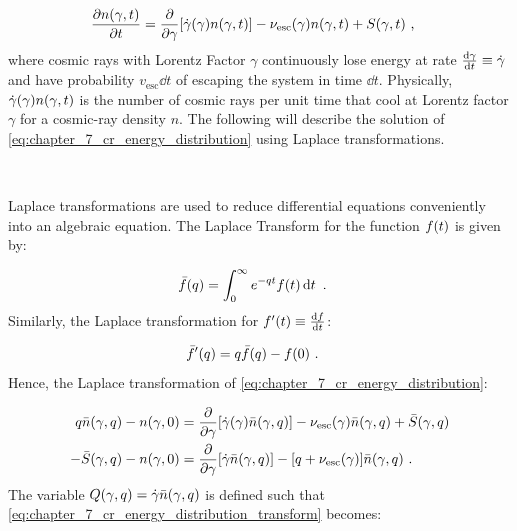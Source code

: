 \begin{equation}
    \begin{aligned}
    \pdv{n\qty(\gamma,t)}{t}&=\pdv{ }{\gamma}\qty[\dot{\gamma}\qty(\gamma)n\qty(\gamma, t)] - \nu_\text{esc}\qty(\gamma)n\qty(\gamma,t) + S\qty(\gamma, t)\text{ ,}
    \end{aligned} \label{eq:chapter_7_cr_energy_distribution}
\end{equation}
\noindent where cosmic rays with Lorentz Factor $\gamma$ continuously lose energy at rate $\dv{\gamma}{t}\equiv \dot{\gamma}$ and have probability $v_\text{esc}\dd{t}$ of escaping the system in time $\dd{t}$. Physically, $\dot{\gamma}\qty(\gamma)n\qty(\gamma,t)$ is the number of cosmic rays per unit time that cool at Lorentz factor $\gamma$ for a cosmic-ray density $n$. The following will describe the solution of \autoref{eq:chapter_7_cr_energy_distribution} using Laplace transformations.
\par~\par
Laplace transformations are used to reduce differential equations conveniently into an algebraic equation. The Laplace Transform for the function $f\qty(t)$ is given by:

\begin{equation}
    \begin{aligned}
        \bar{f}\qty(q)&=\int_0^\infty e^{-qt}f\qty(t)\dd{t}\text{ .}
    \end{aligned}
\end{equation}
\noindent Similarly, the Laplace transformation for $f'\qty(t)\equiv \dv{f}{t}$:

\begin{equation}
	\begin{aligned}
		\bar{f}'\qty(q)&=q\bar{f}\qty(q)-f\qty(0)\text{ .}
	\end{aligned}
\end{equation}
\noindent Hence, the Laplace transformation of \autoref{eq:chapter_7_cr_energy_distribution}:

\begin{equation}
    \begin{aligned}
        q\bar{n}\qty(\gamma, q)-n\qty(\gamma,0)&=\pdv{}{\gamma}\qty[\dot{\gamma}\qty(\gamma)\bar{n}\qty(\gamma, q)] - \nu_\text{esc}\qty(\gamma)\bar{n}\qty(\gamma,q) + \bar{S}\qty(\gamma, q) \\
        -\bar{S}\qty(\gamma,q)-n\qty(\gamma,0)&=\pdv{}{\gamma}\qty[\dot{\gamma}\bar{n}\qty(\gamma,q)]-\qty[q+\nu_\text{esc}\qty(\gamma)]\bar{n}\qty(\gamma,q)\text{ .}
    \end{aligned} \label{eq:chapter_7_cr_energy_distribution_transform}
\end{equation}
\noindent The variable $Q\qty(\gamma,q)=\dot{\gamma}\bar{n}\qty(\gamma,q)$ is defined such that \autoref{eq:chapter_7_cr_energy_distribution_transform} becomes:

